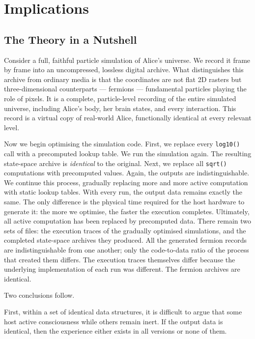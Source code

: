 \chapter{Implications}
\label{chap:implications}

\section{The Theory in a Nutshell}

Consider a full, faithful particle simulation of Alice's universe.
We record it frame by frame into an uncompressed, lossless digital
archive. What distinguishes this archive from ordinary media is that
the coordinates are not flat 2D rasters but three-dimensional
counterparts --- fermions --- fundamental particles playing the role of
pixels. It is a complete, particle-level recording of the entire
simulated universe, including Alice's body, her brain states, and every
interaction. This record is a virtual copy of real-world Alice,
functionally identical at every relevant level.

Now we begin optimising the simulation code. First, we replace every
\texttt{log10()} call with a precomputed lookup table. We run the
simulation again. The resulting state-space archive is \emph{identical}
to the original. Next, we replace all \texttt{sqrt()} computations with
precomputed values. Again, the outputs are indistinguishable. We
continue this process, gradually replacing more and more active
computation with static lookup tables. With every run, the output data
remains exactly the same. The only difference is the physical time
required for the host hardware to generate it: the more we optimise,
the faster the execution completes. Ultimately, all active
computation has been replaced by precomputed data. There remain two
sets of files: the execution traces of the gradually optimised
simulations, and the completed state-space archives they produced. All
the generated fermion records are indistinguishable from one another;
only the code-to-data ratio of the process that created them differs.
The execution traces themselves differ because the underlying
implementation of each run was different. The fermion archives are
identical.

Two conclusions follow.

First, within a set of identical data structures, it is difficult to argue
that some host active consciousness while others remain inert. If
the output data is identical, then the experience either exists in all
versions or none of them.


